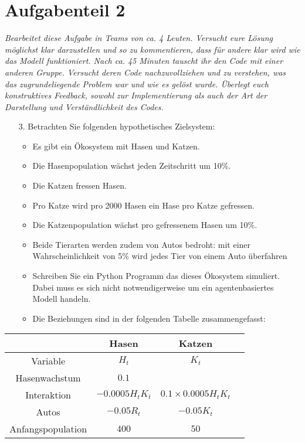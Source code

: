 \documentclass[11pt]{article}
\begin{document}
\newpage
\section*{Aufgabenteil 2}
\textit{Bearbeitet diese Aufgabe in Teams von ca. 4 Leuten. Versucht eure Lösung möglichst klar darzustellen und so zu kommentieren, dass für andere klar wird wie das Modell funktioniert. Nach ca. 45 Minuten tauscht ihr den Code mit einer anderen Gruppe. Versucht deren Code nachzuvollziehen und zu verstehen, was das zugrundeliegende Problem war und wie es gelöst wurde. Überlegt euch konstruktives Feedback, sowohl zur Implementierung als auch der Art der Darstellung und Verständlichkeit des Codes.}

\begin{enumerate}
	\item[3. ] Betrachten Sie folgenden hypothetisches Zielsystem:
	\begin{itemize}
		\item Es gibt ein Ökosystem mit Hasen und Katzen.
		\item Die Hasenpopulation wächst jeden Zeitschritt um 10\%.
		\item Die Katzen fressen Hasen. 
		\item Pro Katze wird pro 2000 Hasen ein Hase pro Katze gefressen.
		\item Die Katzenpopulation wächst pro gefressenem Hasen um 10\%.
		\item Beide Tierarten werden zudem von Autos bedroht: mit einer Wahrscheinlichkeit von 5\% wird jedes Tier von einem Auto überfahren
		\item Schreiben Sie ein Python Programm das dieses Ökosystem simuliert. Dabei muss es sich nicht notwendigerweise um ein agentenbasiertes Modell handeln.
		\item Die Beziehungen sind in der folgenden Tabelle zusammengefasst:
		\end{itemize}
	\end{enumerate}
\begin{center}
\begin{tabular}{cccc}
\toprule
& \textbf{Hasen} & \textbf{Katzen} &\\
\midrule
Variable & $H_t$ & $K_t$ \\
Hasenwachstum & $0.1$ & & \\
Interaktion & $-0.0005H_tK_t$ & $0.1 \times 0.0005H_tK_t$\\
Autos & $-0.05R_t$ & $-0.05K_t$ \\
Anfangspopulation & $400$ & $50$\\
\bottomrule
\end{tabular}
\end{center}
\end{document}
